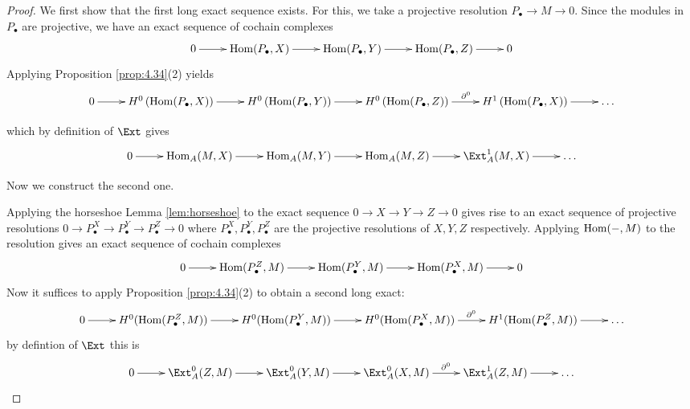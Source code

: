 \documentclass[twoside = false,	%
		headsepline,		%
		parskip = true,
		]{scrbook}						%
\begin{document}
    \begin{proof}
        We first show that the first long exact sequence exists. For this, we take a projective resolution $P_\bullet \to M \to 0$. Since the modules in $P_\bullet$ are projective, we have an exact sequence of cochain complexes
        \begin{equation*}
        \xymatrix{
            0 \ar[r] & \Hom(P_\bullet,X) \ar[r] & \Hom(P_\bullet,Y) \ar[r] & \Hom(P_\bullet,Z) \ar[r] & 0
        }
        \end{equation*}
        Applying Proposition \ref{prop:4.34}(2) yields
        \begin{equation*}
        \xymatrix{
            0 \ar[r] & H^0 \round{\Hom(P_\bullet,X)} \ar[r] & H^0 \round{\Hom(P_\bullet,Y)} \ar[r] & H^0 \round{\Hom(P_\bullet,Z)} \ar[r]^{\partial^0} & H^1 \round{\Hom(P_\bullet,X)} \ar[r]  & \dots
        }
        \end{equation*}

        which by definition of $\Ext$ gives
        \begin{equation*}
        \xymatrix {
        0 \ar[r] & \Hom_A(M,X) \ar[r] & \Hom_A(M,Y) \ar[r] & \Hom_A(M,Z) \ar[r] & \Ext_A^1(M,X) \ar[r] & \dots 
        }
        \end{equation*}

        Now we construct the second one.

        Applying the horseshoe Lemma \ref{lem:horseshoe} to the exact sequence $0 \to X \to Y \to Z \to 0$ gives rise to an exact sequence of projective resolutions $0 \to P^X_\bullet \to P^Y_\bullet \to P^Z_\bullet \to 0$ where $P^X_\bullet, P^Y_\bullet, P^Z_\bullet$ are the projective resolutions of $X,Y,Z$ respectively. Applying $\mathrm{Hom}(-,M)$ to the resolution gives an exact sequence of cochain complexes
        \begin{equation*}
            \xymatrix{
                0 \ar[r] & \Hom(P_\bullet^Z,M) \ar[r] & \Hom(P_\bullet^Y,M) \ar[r] & \Hom(P_\bullet^X,M) \ar[r] & 0
            }
        \end{equation*}
        Now it suffices to apply Proposition \ref{prop:4.34}(2) to obtain a second long exact:
        \begin{equation*}
        \xymatrix {
            0 \ar[r] & H^0(\Hom(P_\bullet^Z,M)) \ar[r] & H^0(\Hom(P_\bullet^Y,M)) \ar[r] & H^0(\Hom(P_\bullet^X,M)) \ar[r]^{\partial^0} & H^1(\Hom(P_\bullet^Z,M)) \ar[r] & \dots
        }
        \end{equation*}
        by defintion of $\Ext$ this is
        \begin{equation*}
        \xymatrix {
            0 \ar[r] & \Ext^0_A(Z,M) \ar[r] & \Ext^0_A(Y,M) \ar[r] & \Ext^0_A(X,M) \ar[r]^{\partial^0} & \Ext^1_A(Z,M) \ar[r] & \dots
        }
        \end{equation*}
    \end{proof}
\end{document}
